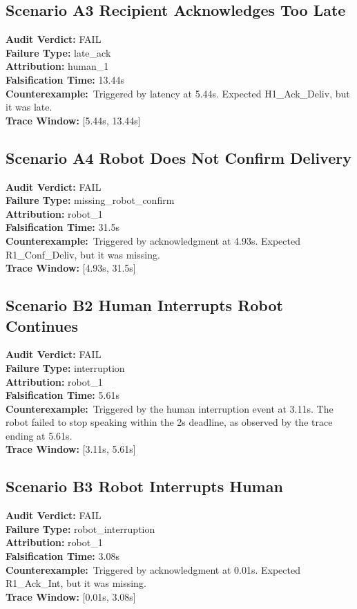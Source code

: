 \documentclass[10pt, letterpaper]{article}
\begin{document}
\subsection{Scenario A3 Recipient Acknowledges Too Late}
\textbf{Audit Verdict:} FAIL \\
\textbf{Failure Type:} late\_ack \\
\textbf{Attribution:} human\_1 \\
\textbf{Falsification Time:} 13.44s \\
\textbf{Counterexample:}\ Triggered by latency at 5.44s. Expected H1\_Ack\_Deliv, but it was late. \\
\textbf{Trace Window:} [5.44s, 13.44s]

\subsection{Scenario A4 Robot Does Not Confirm Delivery}
\textbf{Audit Verdict:} FAIL \\
\textbf{Failure Type:} missing\_robot\_confirm \\
\textbf{Attribution:} robot\_1 \\
\textbf{Falsification Time:} 31.5s \\
\textbf{Counterexample:}\ Triggered by acknowledgment at 4.93s. Expected R1\_Conf\_Deliv, but it was missing. \\
\textbf{Trace Window:} [4.93s, 31.5s]

\subsection{Scenario B2 Human Interrupts Robot Continues}
\textbf{Audit Verdict:} FAIL \\
\textbf{Failure Type:} interruption \\
\textbf{Attribution:} robot\_1 \\
\textbf{Falsification Time:} 5.61s \\
\textbf{Counterexample:}\ Triggered by the human interruption event at 3.11s. The robot failed to stop speaking within the 2s deadline, as observed by the trace ending at 5.61s. \\
\textbf{Trace Window:} [3.11s, 5.61s]

\subsection{Scenario B3 Robot Interrupts Human}
\textbf{Audit Verdict:} FAIL \\
\textbf{Failure Type:} robot\_interruption \\
\textbf{Attribution:} robot\_1 \\
\textbf{Falsification Time:} 3.08s \\
\textbf{Counterexample:}\ Triggered by acknowledgment at 0.01s. Expected R1\_Ack\_Int, but it was missing. \\
\textbf{Trace Window:} [0.01s, 3.08s]
\end{document}
